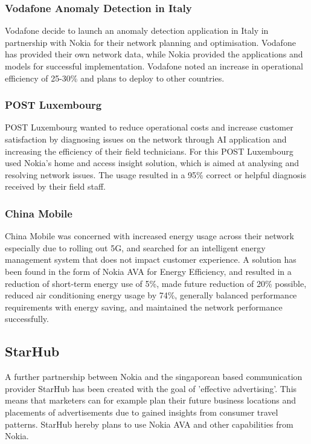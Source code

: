 \documentclass[a4paper,12pt]{report}
\begin{document}
			\subsubsection{Vodafone Anomaly Detection in Italy}
				Vodafone decide to launch an anomaly detection application in Italy in partnership with Nokia for their network planning and optimisation. Vodafone has provided their own network data, while Nokia provided the applications and models for successful implementation. Vodafone noted an increase in operational efficiency of 25-30\% and plans to deploy to other countries.	
			\subsubsection{POST Luxembourg}
				POST Luxembourg wanted to reduce operational costs and increase customer satisfaction by diagnosing issues on the network through AI application and increasing the efficiency of their field technicians.
			For this POST Luxembourg used Nokia's home and access insight solution, which is aimed at analysing and resolving network issues. The usage resulted in a 95\% correct or helpful diagnosis received by their field staff.
			\subsubsection{China Mobile}
				China Mobile was concerned with increased energy usage across their network especially due to rolling out 5G, and searched for an intelligent energy management system that does not impact customer experience.
				A solution has been found in the form of Nokia AVA for Energy Efficiency, and resulted in a reduction of short-term energy use of 5\%, made future reduction of 20\% possible, reduced air conditioning energy usage by 74\%, generally balanced performance requirements with energy saving, and maintained the network performance successfully.
		\closesection	
		\subsection[StarHub]{StarHub \cite{StarhubNokia}}
		\startsubsection
			A further partnership between Nokia and the singaporean  based communication provider StarHub has been created with the goal of 'effective advertising'. This means that marketers can for example plan their future business locations and placements of advertisements due to gained insights from consumer travel patterns. StarHub hereby plans to use Nokia AVA and other capabilities from Nokia. 
		\closesection
\end{document}
